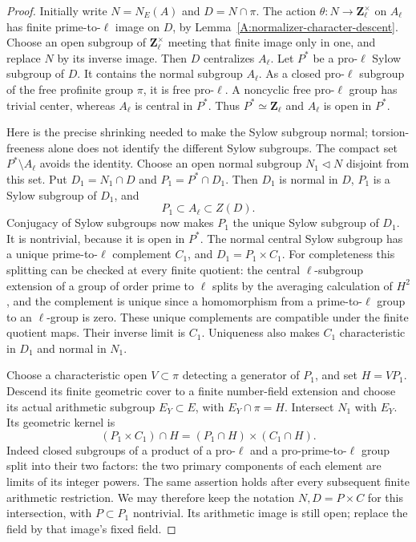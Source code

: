 \begin{proof}
Initially write $N=N_E(A)$ and $D=N\cap\pi$.
The action $\theta:N\to\mathbf Z_\ell^\times$
on $A_\ell$ has finite prime-to-$\ell$ image
on $D$, by Lemma~\ref{A:normalizer-character-descent}.
Choose an open subgroup of
$\mathbf Z_\ell^\times$ meeting that finite image
only in one, and replace $N$ by its inverse
image. Then $D$ centralizes $A_\ell$.
Let $P^*$ be a pro-$\ell$ Sylow subgroup of $D$.
It contains the normal subgroup $A_\ell$.
As a closed pro-$\ell$ subgroup of the free
profinite group $\pi$, it is free pro-$\ell$.
A noncyclic free pro-$\ell$ group has trivial
center, whereas $A_\ell$ is central in $P^*$.
Thus $P^*\simeq\mathbf Z_\ell$ and $A_\ell$
is open in $P^*$.

Here is the precise shrinking needed to make the
Sylow subgroup normal; torsion-freeness alone
does not identify the different Sylow subgroups.
The compact set $P^*\setminus A_\ell$ avoids
the identity. Choose an open normal subgroup
$N_1\triangleleft N$ disjoint from this set.
Put $D_1=N_1\cap D$ and $P_1=P^*\cap D_1$.
Then $D_1$ is normal in $D$, $P_1$ is a Sylow
subgroup of $D_1$, and
\[
                 P_1\subset A_\ell\subset Z(D).
\]
Conjugacy of Sylow subgroups now makes $P_1$
the unique Sylow subgroup of $D_1$.
It is nontrivial, because it is open in $P^*$.
The normal central Sylow subgroup has a unique
prime-to-$\ell$ complement $C_1$, and
$D_1=P_1\times C_1$.
For completeness this splitting can be checked
at every finite quotient: the central
$\ell$-subgroup extension of a group of order
prime to $\ell$ splits by the averaging
calculation of $H^2$, and the complement is
unique since a homomorphism from a prime-to-$\ell$
group to an $\ell$-group is zero. These unique
complements are compatible under the finite
quotient maps. Their inverse limit is $C_1$.
Uniqueness also makes $C_1$ characteristic in
$D_1$ and normal in $N_1$.

Choose a characteristic open $V\subset\pi$
detecting a generator of $P_1$, and set
$H=V P_1$. Descend its finite geometric cover
to a finite number-field extension and choose
its actual arithmetic subgroup $E_Y\subset E$,
with $E_Y\cap\pi=H$. Intersect $N_1$ with
$E_Y$. Its geometric kernel is
\[
 (P_1\times C_1)\cap H
       =(P_1\cap H)\times(C_1\cap H).
                                                        \tag{A45}
\]
Indeed closed subgroups of a product of a
pro-$\ell$ and a pro-prime-to-$\ell$ group
split into their two factors: the two primary
components of each element are limits of its
integer powers. The same assertion holds
after every subsequent finite arithmetic
restriction. We may therefore keep the notation
$N,D=P\times C$ for this intersection, with
$P\subset P_1$ nontrivial. Its arithmetic
image is still open; replace the field by
that image's fixed field.


\end{proof}
